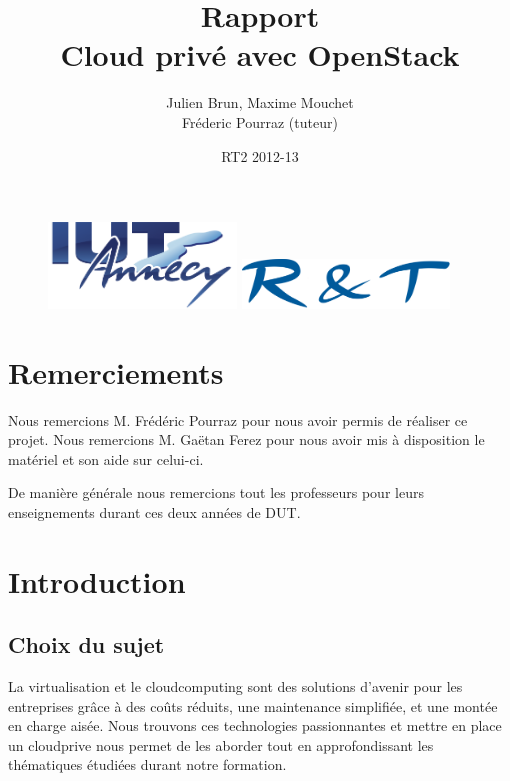 \documentclass[a4paper,oneside]{report}
\title{Rapport \\ \og Cloud privé avec OpenStack \fg}
\author{Julien Brun, Maxime Mouchet \\ Fréderic Pourraz (tuteur)}
\date{RT2 2012-13}
\begin{document}
\begin{figure}
\includegraphics[width=5cm]{images/iut.png}\hfill
\includegraphics[width=5.5cm]{images/rt.png}
\end{figure}

\maketitle

\clearpage
\thispagestyle{empty}
\null\newpage

\chapter*{Remerciements}
\thispagestyle{empty}
\noindent Nous remercions M. Frédéric Pourraz pour nous avoir permis de réaliser ce projet.\newline
\noindent Nous remercions M. Gaëtan Ferez pour nous avoir mis à disposition le matériel et son aide sur celui-ci.

\noindent De manière générale nous remercions tout les professeurs pour leurs enseignements durant ces deux années de DUT.

\renewcommand{\contentsname}{Sommaire}
\setcounter{tocdepth}{1}
\tableofcontents

\chapter{Introduction}
\section{Choix du sujet}
La \gls{virtualisation} et le \gls{cloudcomputing} sont des solutions d'avenir pour les entreprises grâce à des coûts réduits, une maintenance simplifiée, et une montée en charge aisée.
Nous trouvons ces technologies passionnantes et mettre en place un \gls{cloudprive} nous permet de les aborder tout en approfondissant les thématiques étudiées durant notre formation.
\end{document}

